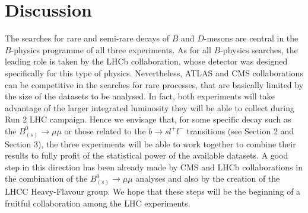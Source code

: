 %
%
%
%
%
%
%
%
%
\section{Discussion}
The searches for rare and semi-rare decays of $B$ and $D$-mesons are central in the $B$-physics programme of all three experiments. As for all $B$-physics searches, the leading role is taken by the LHCb collaboration, whose detector was designed specifically for this type of physics. Nevertheless, ATLAS and CMS collaborations can be competitive in the searches for rare processes, that are basically limited by the size of the datasets to be analysed. In fact, both experiments will take advantage of the larger integrated luminosity they will be able to collect during Run 2 LHC campaign. Hence we envisage that, for some specific decay such as the $B_{(s)}^0 \to \mu \mu$ or those related to the $b \to s l^+ l^-$ transitions (see Section 2 and Section 3), the three experiments will be able to work together to combine their results to fully profit of the statistical power of the available datasets. A good step in this direction has been already made by CMS and LHCb collaborations in the combination of the $B_{(s)}^0 \to \mu \mu$ analyses and also by the creation of the LHCC Heavy-Flavour group. We hope that these steps will be the beginning of a fruitful collaboration among the LHC experiments.
%